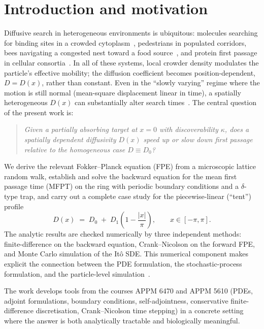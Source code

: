 \section{Introduction and motivation}

Diffusive search in heterogeneous environments is ubiquitous: molecules searching
for binding sites in a crowded cytoplasm~\cite{Elf2005,Metzler2014}, pedestrians
in populated corridors, bees navigating a congested nest toward a food
source~\cite{Peleg2018, Ocko2014}, and protein first passage in cellular
consortia~\cite{Schuss2015,Benichou2010}.  In all of these systems, local crowder
density modulates the particle's effective mobility; the diffusion coefficient
becomes position-dependent, $D=D(x)$, rather than constant.  Even in the
``slowly varying'' regime where the motion is still normal (mean-square
displacement linear in time), a spatially heterogeneous $D(x)$ can substantially
alter search times~\cite{Redner2001}. The central question of the present work is:
\begin{quote}
\itshape
Given a partially absorbing target at $x=0$ with discoverability $\kappa$, does a
spatially dependent diffusivity $D(x)$ speed up or slow down first passage
relative to the homogeneous case $D\equiv D_0$?
\end{quote}
We derive the relevant Fokker--Planck equation (FPE) from a microscopic lattice random
walk, establish and solve the backward equation for the mean first
passage time (MFPT) on the ring with periodic boundary conditions and a $\delta$-type trap, and carry out a complete
case study for the piecewise-linear (``tent'') profile
\begin{equation}
D(x)\;=\;D_0 \;+\; D_1\!\left(1-\frac{|x|}{\pi}\right),
\qquad x\in[-\pi,\pi]. \label{eq:tent}
\end{equation}
The analytic results are checked numerically by three independent methods:
finite-difference on the backward equation, Crank--Nicolson on the forward FPE,
and Monte Carlo simulation of the It\^o SDE.  This numerical component makes
explicit the connection between the PDE formulation, the stochastic-process
formulation, and the particle-level simulation~\cite{Gardiner2009,Pavliotis2014,Kloeden1992}.

The work develops tools from the courses APPM 6470 and APPM 5610 (PDEs, adjoint formulations, boundary conditions, self-adjointness, conservative
finite-difference discretisation, Crank--Nicolson time stepping) in a concrete
setting where the answer is both analytically tractable and biologically
meaningful.

